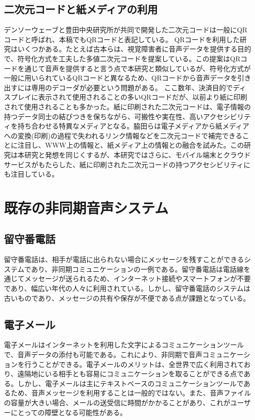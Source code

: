 \documentclass[submit,techrep,noauthor]{ipsj}
\begin{document}
\subsection{二次元コードと紙メディアの利用}
デンソーウェーブと豊田中央研究所が共同で開発した二次元コードは一般にQRコードと呼ばれ、本稿でもQRコードと表記している。
QRコードを利用した研究はいくつかある。たとえば古本らは、視覚障害者に音声データを提供する目的で、符号化方式を工夫した多値二次元コードを提案している。この提案はQRコードを通じて音声を提供すると言う点で本研究と類似しているが、符号化方式が一般に用いられているQRコードと異なるため、QRコードから音声データを引き出すには専用のデコーダが必要という問題がある。
ここ数年、決済目的でディスプレイに表示されて使用されることの多いQRコードだが、以前より紙に印刷されて使用されることも多かった。紙に印刷された二次元コードは、電子情報の持つデータ同士の結びつきを保ちながら、可搬性や実在性、高いアクセシビリティを持ち合わせる特異なメディアとなる。脇田らは電子メディアから紙メディアへの変換(印刷)の過程で失われるリンク情報などを二次元コードで補完できることに注目し、WWW上の情報と、紙メディア上の情報との融合を試みた。この研究は本研究と発想を同じくするが、本研究ではさらに、モバイル端末とクラウドサービスがもたらした、紙に印刷された二次元コードの持つアクセシビリティにも注目している。

\section{既存の非同期音声システム}

\subsection{留守番電話}
留守番電話は、相手が電話に出られない場合にメッセージを残すことができるシステムであり、非同期コミュニケーションの一例である。留守番電話は電話線を通じてメッセージが送られるため、インターネット接続やスマートフォンが不要であり、幅広い年代の人々に利用されている。しかし、留守番電話のシステムは古いものであり、メッセージの共有や保存が不便である点が課題となっている。

\subsection{電子メール}
電子メールはインターネットを利用した文字によるコミュニケーションツールで、音声データの添付も可能である。これにより、非同期で音声コミュニケーションを行うことができる。電子メールのメリットは、全世界で広く利用されており、遠隔地にいる相手とも容易にコミュニケーションを取ることができる点である。しかし、電子メールは主にテキストベースのコミュニケーションツールであるため、音声メッセージを利用することは一般的ではない。また、音声ファイルの容量が大きい場合、メールの送受信に時間がかかることがあり、これがユーザーにとっての障壁となる可能性がある。
\end{document}
